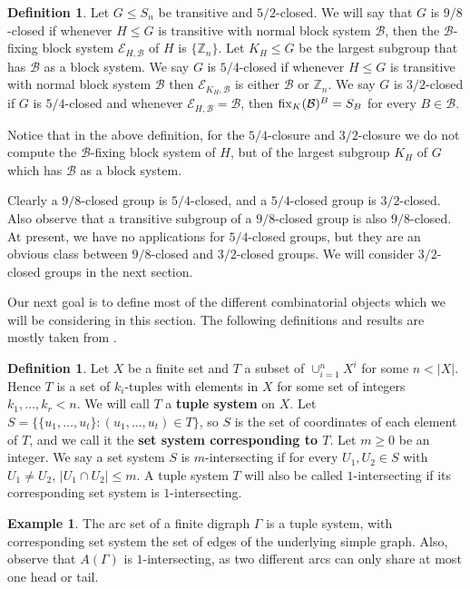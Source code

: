 \documentclass{amsart}
\theoremstyle{definition}
\newtheorem{definition}[thrm]{Definition}
\newtheorem{example}{Example}[section]
\theoremstyle{remark}
\numberwithin{equation}{section}
\def\Z{{\mathbb Z}}
\def\fix{{\rm fix}}
\def\cal{\mathcal}
\begin{document}
\begin{definition}
Let $G\le S_n$ be transitive and $5/2$-closed.  We will say that $G$ is $9/8$-closed if whenever $H\le G$ is transitive with normal block system ${\cal B}$, then the ${\cal B}$-fixing block system ${\cal E}_{H,{\cal B}}$ of $H$ is $\{\Z_n\}$.  Let $K_H\le G$ be the largest subgroup that has ${\cal B}$ as a block system.  We say $G$ is $5/4$-closed if whenever $H\le G$ is transitive with normal block system ${\cal B}$ then ${\cal E}_{K_H,{\cal B}}$ is either ${\cal B}$ or $\Z_n$.   We say $G$ is $3/2$-closed if $G$ is $5/4$-closed and whenever ${\cal E}_{H,{\cal B}} = {\cal B}$, then $\fix_K({\cal B})^B = S_B$ for every $B\in{\cal B}$.
\end{definition}

Notice that in the above definition, for the $5/4$-closure and $3/2$-closure we do not compute the ${\cal B}$-fixing block system of $H$, but of the largest subgroup $K_H$ of $G$ which has ${\cal B}$ as a block system.

Clearly a $9/8$-closed group is $5/4$-closed, and a $5/4$-closed group is $3/2$-closed.  Also observe that a transitive subgroup of a $9/8$-closed group is also $9/8$-closed.  At present, we have no applications for $5/4$-closed groups, but they are an obvious class between $9/8$-closed and $3/2$-closed groups.  We will consider $3/2$-closed groups in the next section.

Our next goal is to define most of the different combinatorial objects which we will be considering in this section.  The following definitions and results are mostly taken from \cite{Dobson2023apreprint}.

\begin{definition}\label{tuple def}
Let $X$ be a finite set and $T$ a subset of $\cup_{i=1}^n X^i$ for some $n < \vert X\vert$.  Hence $T$ is a set of $k_i$-tuples with elements in $X$ for some set of integers $k_1,\ldots,k_r < n$.  We will call $T$ a {\bf tuple system} on $X$.  Let $S = \{\{u_1,\ldots,u_t\}:(u_1,\ldots,u_t)\in T\}$, so $S$ is the set of coordinates of each element of $T$, and we call it the  {\bf set system corresponding to $T$}.  Let $m\ge 0$ be an integer.  We say a set system $S$ is $m$-intersecting if for every $U_1,U_2\in S$ with $U_1\not = U_2$, $\vert U_1\cap U_2\vert\le m$.  A tuple system $T$ will also be called $1$-intersecting if its corresponding set system is $1$-intersecting.
\end{definition}

\begin{example}
The arc set of a finite digraph $\Gamma$ is a tuple system, with corresponding set system the set of edges of the underlying simple graph.  Also, observe that $A(\Gamma)$ is $1$-intersecting, as two different arcs can only share at most one head or tail.
\end{example}
\end{document}

